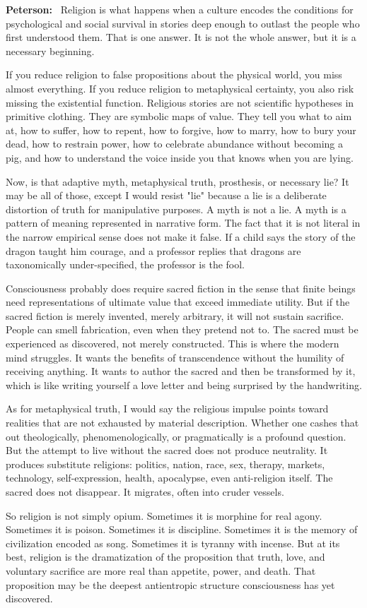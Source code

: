 \documentclass[a4paper,11pt]{article}
\newenvironment{answer}{\par\noindent\color{black}\textbf{Peterson:}\ }{\par}
\begin{document}
\begin{answer}
Religion is what happens when a culture encodes the conditions for psychological and social survival in stories deep enough to outlast the people who first understood them. That is one answer. It is not the whole answer, but it is a necessary beginning.

If you reduce religion to false propositions about the physical world, you miss almost everything. If you reduce religion to metaphysical certainty, you also risk missing the existential function. Religious stories are not scientific hypotheses in primitive clothing. They are symbolic maps of value. They tell you what to aim at, how to suffer, how to repent, how to forgive, how to marry, how to bury your dead, how to restrain power, how to celebrate abundance without becoming a pig, and how to understand the voice inside you that knows when you are lying.

Now, is that adaptive myth, metaphysical truth, prosthesis, or necessary lie? It may be all of those, except I would resist "lie" because a lie is a deliberate distortion of truth for manipulative purposes. A myth is not a lie. A myth is a pattern of meaning represented in narrative form. The fact that it is not literal in the narrow empirical sense does not make it false. If a child says the story of the dragon taught him courage, and a professor replies that dragons are taxonomically under-specified, the professor is the fool.

Consciousness probably does require sacred fiction in the sense that finite beings need representations of ultimate value that exceed immediate utility. But if the sacred fiction is merely invented, merely arbitrary, it will not sustain sacrifice. People can smell fabrication, even when they pretend not to. The sacred must be experienced as discovered, not merely constructed. This is where the modern mind struggles. It wants the benefits of transcendence without the humility of receiving anything. It wants to author the sacred and then be transformed by it, which is like writing yourself a love letter and being surprised by the handwriting.

As for metaphysical truth, I would say the religious impulse points toward realities that are not exhausted by material description. Whether one cashes that out theologically, phenomenologically, or pragmatically is a profound question. But the attempt to live without the sacred does not produce neutrality. It produces substitute religions: politics, nation, race, sex, therapy, markets, technology, self-expression, health, apocalypse, even anti-religion itself. The sacred does not disappear. It migrates, often into cruder vessels.

So religion is not simply opium. Sometimes it is morphine for real agony. Sometimes it is poison. Sometimes it is discipline. Sometimes it is the memory of civilization encoded as song. Sometimes it is tyranny with incense. But at its best, religion is the dramatization of the proposition that truth, love, and voluntary sacrifice are more real than appetite, power, and death. That proposition may be the deepest antientropic structure consciousness has yet discovered.
\end{answer}
\end{document}

